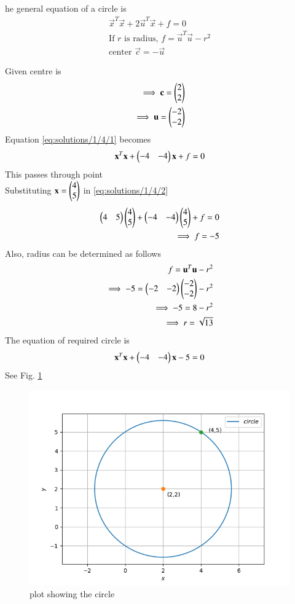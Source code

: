 he general equation of a circle is
\begin{align}
   \vec{x}^T\vec{x}+2\vec{u}^T\vec{x}+f=0\label{eq:solutions/1/4/1} \\
   \text{If $r$ is radius,  }f=\vec{u}^T\vec{u}-r^2\\
   \text{center }\vec{c}=-\vec{u}
\end{align}

Given centre is 
\begin{align}
    \implies \mathbf{c}=\begin{pmatrix}2\\2\end{pmatrix}\\
    \implies \mathbf{u}=\begin{pmatrix}-2\\-2\end{pmatrix}
\end{align}
Equation \eqref{eq:solutions/1/4/1} becomes
\begin{align}
  \mathbf{x}^T\mathbf{x}+\begin{pmatrix}-4&-4\end{pmatrix}\mathbf{x}+f=0\label{eq:solutions/1/4/2}
\end{align}
This passes through point \\
Substituting $\mathbf{x}=\begin{pmatrix}4\\5\end{pmatrix}$ in \eqref{eq:solutions/1/4/2}
\begin{align}
\begin{pmatrix}4&5\end{pmatrix}\begin{pmatrix}4\\5\end{pmatrix}+\begin{pmatrix}-4&-4\end{pmatrix}\begin{pmatrix}4\\5\end{pmatrix}+f=0\\
\implies f=-5
\end{align}
Also, radius can be determined as follows
\begin{align}
  f=\mathbf{u}^T\mathbf{u}-r^2 \\
  \implies -5=\begin{pmatrix}-2&-2\end{pmatrix}\begin{pmatrix}-2\\-2\end{pmatrix}-r^2\\
  \implies -5=8-r^2\\
  \implies r=\sqrt{13}
\end{align}
The equation of required circle is 
\begin{align}
  \mathbf{x}^T\mathbf{x}+\begin{pmatrix}-4&-4\end{pmatrix}\mathbf{x}-5=0
\end{align}
See Fig. \ref{eq:solutions/1/4/Fig}

\begin{figure}[!ht]
\centering
\includegraphics[width=\columnwidth]{./solutions/conics/1/4/plot.png}
\caption{plot showing the circle}
\label{eq:solutions/1/4/Fig}
\end{figure}
